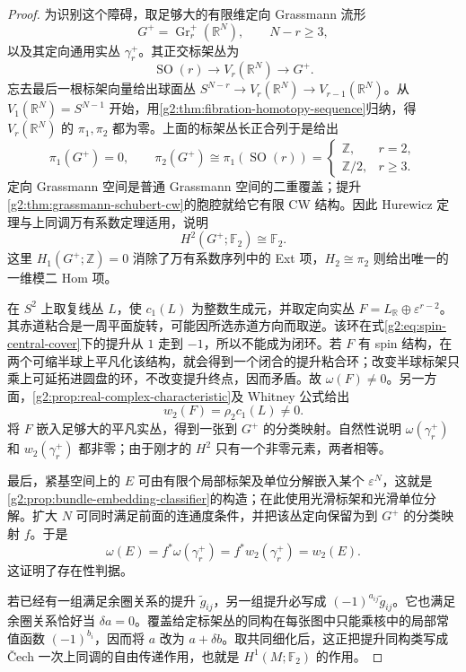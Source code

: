 \begin{proof}
	为识别这个障碍，取足够大的有限维定向 Grassmann 流形
	\[
		G^+=\operatorname{Gr}_r^+(\mathbb R^N),\qquad N-r\ge3,
	\]
	以及其定向通用实丛 \(\gamma_r^+\)。其正交标架丛为
	\[
		\operatorname{SO}(r)\longrightarrow V_r(\mathbb R^N)\longrightarrow G^+.
	\]
	忘去最后一根标架向量给出球面丛 \(S^{N-r}\to V_r(\mathbb R^N)\to V_{r-1}(\mathbb R^N)\)。从 \(V_1(\mathbb R^N)=S^{N-1}\) 开始，用\cref{g2:thm:fibration-homotopy-sequence}归纳，得 \(V_r(\mathbb R^N)\) 的 \(\pi_1,\pi_2\) 都为零。上面的标架丛长正合列于是给出
	\[
		\pi_1(G^+)=0,\qquad \pi_2(G^+)\cong\pi_1(\operatorname{SO}(r))
		=\begin{cases}\mathbb Z,&r=2,\\\mathbb Z/2,&r\ge3.\end{cases}
	\]
	定向 Grassmann 空间是普通 Grassmann 空间的二重覆盖；提升\cref{g2:thm:grassmann-schubert-cw}的胞腔就给它有限 CW 结构。因此 Hurewicz 定理与上同调万有系数定理适用，说明
	\[
		H^2(G^+;\mathbb F_2)\cong\mathbb F_2.
	\]
	这里 \(H_1(G^+;\mathbb Z)=0\) 消除了万有系数序列中的 Ext 项，\(H_2\cong\pi_2\) 则给出唯一的一维模二 Hom 项。

	在 \(S^2\) 上取复线丛 \(L\)，使 \(c_1(L)\) 为整数生成元，并取定向实丛 \(F=L_{\mathbb R}\oplus\varepsilon^{r-2}\)。其赤道粘合是一周平面旋转，可能因所选赤道方向而取逆。该环在式\eqref{g2:eq:spin-central-cover}下的提升从 \(1\) 走到 \(-1\)，所以不能成为闭环。若 \(F\) 有 spin 结构，在两个可缩半球上平凡化该结构，就会得到一个闭合的提升粘合环；改变半球标架只乘上可延拓进圆盘的环，不改变提升终点，因而矛盾。故 \(\omega(F)\ne0\)。另一方面，\cref{g2:prop:real-complex-characteristic}及 Whitney 公式给出
	\[
		w_2(F)=\rho_2c_1(L)\ne0.
	\]
	将 \(F\) 嵌入足够大的平凡实丛，得到一张到 \(G^+\) 的分类映射。自然性说明 \(\omega(\gamma_r^+)\) 和 \(w_2(\gamma_r^+)\) 都非零；由于刚才的 \(H^2\) 只有一个非零元素，两者相等。

	最后，紧基空间上的 \(E\) 可由有限个局部标架及单位分解嵌入某个 \(\varepsilon^N\)，这就是\cref{g2:prop:bundle-embedding-classifier}的构造；在此使用光滑标架和光滑单位分解。扩大 \(N\) 可同时满足前面的连通度条件，并把该丛定向保留为到 \(G^+\) 的分类映射 \(f\)。于是
	\[
		\omega(E)=f^*\omega(\gamma_r^+)=f^*w_2(\gamma_r^+)=w_2(E).
	\]
	这证明了存在性判据。

	若已经有一组满足余圈关系的提升 \(\widetilde g_{ij}\)，另一组提升必写成 \((-1)^{a_{ij}}\widetilde g_{ij}\)。它也满足余圈关系恰好当 \(\delta a=0\)。覆盖给定标架丛的同构在每张图中只能乘核中的局部常值函数 \((-1)^{b_i}\)，因而将 \(a\) 改为 \(a+\delta b\)。取共同细化后，这正把提升同构类写成 Čech 一次上同调的自由传递作用，也就是 \(H^1(M;\mathbb F_2)\) 的作用。
\end{proof}

